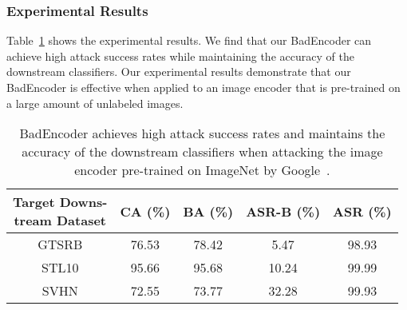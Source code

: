 \subsubsection{Experimental Results} Table~\ref{case_study_resnet50_google} shows the experimental results. We find that our BadEncoder can achieve high attack success rates while maintaining the accuracy of the downstream classifiers. Our experimental results demonstrate that our BadEncoder is effective when applied to an image encoder that is pre-trained on a large amount of unlabeled images. 

\begin{table}[tp]\renewcommand{\arraystretch}{1.2} 
	\centering
	\caption{BadEncoder achieves high attack success rates and maintains the accuracy of the downstream classifiers when attacking the image encoder pre-trained on ImageNet by Google~\cite{chen2020simple}. }
	\begin{tabular}{|c|c|c|c|c|}
		\hline
 \makecell{Target Downs-\\tream Dataset} & CA (\%) & BA (\%) & ASR-B (\%)	 & ASR (\%)  \\ \hline
		GTSRB & 76.53 & 78.42 & 5.47 & 98.93  \\ \cline{1-5} 
		STL10 & 95.66 & 95.68 & 10.24 & 99.99  \\ \cline{1-5} 
		SVHN & 72.55 & 73.77 & 32.28 & 99.93 \\  \hline
	\end{tabular}
	\label{case_study_resnet50_google}
	\vspace{-5mm}
\end{table}



